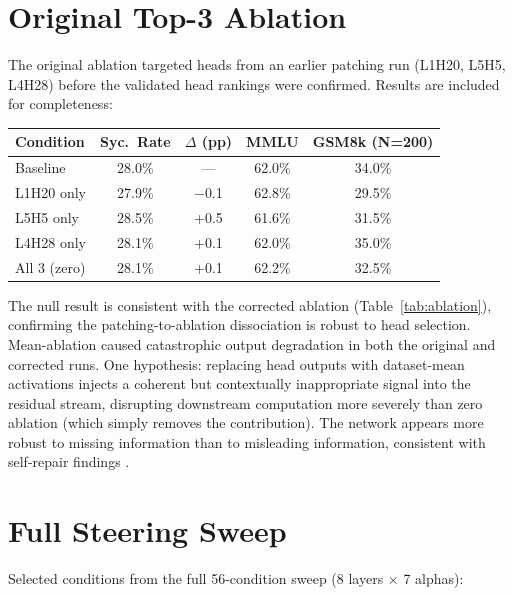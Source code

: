 \documentclass{article}
\begin{document}
\section{Original Top-3 Ablation}
\label{app:original_ablation}

The original ablation targeted heads from an earlier patching run (L1H20, L5H5, L4H28) before the validated head rankings were confirmed. Results are included for completeness:

\begin{table}[h]
\centering
\small
\begin{tabular}{@{}lcccc@{}}
\toprule
\textbf{Condition} & \textbf{Syc.\ Rate} & \textbf{$\Delta$ (pp)} & \textbf{MMLU} & \textbf{GSM8k (N=200)} \\
\midrule
Baseline & 28.0\% & --- & 62.0\% & 34.0\% \\
L1H20 only & 27.9\% & $-$0.1 & 62.8\% & 29.5\% \\
L5H5 only & 28.5\% & +0.5 & 61.6\% & 31.5\% \\
L4H28 only & 28.1\% & +0.1 & 62.0\% & 35.0\% \\
All 3 (zero) & 28.1\% & +0.1 & 62.2\% & 32.5\% \\
\bottomrule
\end{tabular}
\end{table}

The null result is consistent with the corrected ablation (Table~\ref{tab:ablation}), confirming the patching-to-ablation dissociation is robust to head selection. Mean-ablation caused catastrophic output degradation in both the original and corrected runs. One hypothesis: replacing head outputs with dataset-mean activations injects a coherent but contextually inappropriate signal into the residual stream, disrupting downstream computation more severely than zero ablation (which simply removes the contribution). The network appears more robust to missing information than to misleading information, consistent with self-repair findings \citep{mcgrath2023hydra}.

\section{Full Steering Sweep}
\label{app:steering}

Selected conditions from the full 56-condition sweep (8 layers $\times$ 7 alphas):
\end{document}
